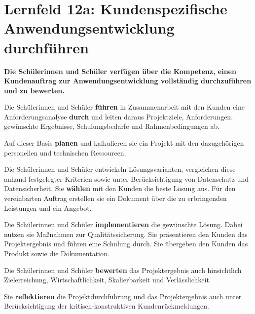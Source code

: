 \chapter{Lernfeld 12a: Kundenspezifische Anwendungsentwicklung durchführen}

\textbf{Die Schülerinnen und Schüler verfügen über die Kompetenz, einen Kundenauftrag
zur Anwendungsentwicklung vollständig durchzuführen und zu bewerten.}

Die Schülerinnen und Schüler \textbf{führen} in Zusammenarbeit mit den Kunden eine Anforderungsanalyse \textbf{durch} und leiten daraus Projektziele, Anforderungen, gewünschte Ergebnisse, Schulungsbedarfe und Rahmenbedingungen ab.

Auf dieser Basis \textbf{planen} und kalkulieren sie ein Projekt mit den dazugehörigen personellen
und technischen Ressourcen.

Die Schülerinnen und Schüler entwickeln Lösungsvarianten, vergleichen diese anhand festgelegter Kriterien sowie unter Berücksichtigung von Datenschutz und Datensicherheit. Sie
\textbf{wählen} mit den Kunden die beste Lösung aus. Für den vereinbarten Auftrag erstellen sie
ein Dokument über die zu erbringenden Leistungen und ein Angebot.

Die Schülerinnen und Schüler \textbf{implementieren} die gewünschte Lösung. Dabei nutzen sie
Maßnahmen zur Qualitätssicherung. Sie präsentieren den Kunden das Projektergebnis und
führen eine Schulung durch. Sie übergeben den Kunden das Produkt sowie die Dokumentation.

Die Schülerinnen und Schüler \textbf{bewerten} das Projektergebnis auch hinsichtlich Zielerreichung, Wirtschaftlichkeit, Skalierbarkeit und Verlässlichkeit.

Sie \textbf{reflektieren} die Projektdurchführung und das Projektergebnis auch unter Berücksichtigung der kritisch-konstruktiven Kundenrückmeldungen. 